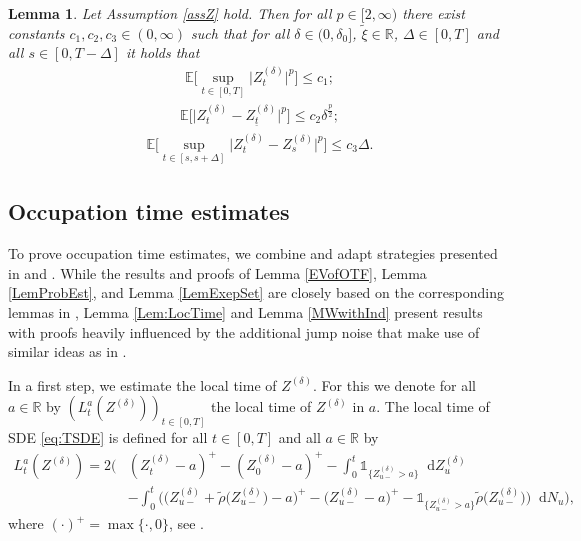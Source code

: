 \documentclass[11pt,a4paper]{article}
\numberwithin{equation}{section}
\newtheorem{lemma}[theorem]{Lemma}
\theoremstyle{definition}
\newcommand{\E}{{\mathbb{E}}}
\newcommand{\R}{{\mathbb{R}}}
\newcommand{\diff}{\mathop{}\!\mathrm{d}}
\begin{document}
\begin{lemma}\label{ME}
Let Assumption \ref{assZ} hold. Then for all $p\in[2,\infty)$ there exist constants $c_1, c_2, c_3 \in(0,\infty)$ such that for all $\delta\in(0,\delta_0]$, $\widetilde\xi\in\R$, $\Delta \in[0,T]$ and all $s\in[0,T-\Delta]$ it holds that 
\begin{equation}\label{LME1}
\begin{aligned}
\E\Big[\sup_{t\in[0,T]} \big|Z^{(\delta)}_t\big|^p\Big] \leq c_1;
\end{aligned}
\end{equation}
\begin{equation}\label{LME2}
\begin{aligned}
\E\Big[  \big|Z^{(\delta)}_t- Z^{(\delta)}_{\underline t}\big|^p\Big] \leq c_2 \delta^{\frac{p}{2}};
\end{aligned}
\end{equation}
\begin{equation}\label{LME4}
    \begin{aligned}
    \E\Big[\sup_{t\in[s,s+\Delta]} \big|Z^{(\delta)}_t- Z^{(\delta)}_{s}\big|^p\Big] \leq c_3 \Delta.
    \end{aligned}
\end{equation}
\end{lemma}

\subsection{Occupation time estimates}

To prove occupation time estimates, we combine and adapt strategies presented in \cite{PSS2024JMS} and \cite{Yaroslavtseva2022}. While the results and proofs of Lemma \ref{EVofOTF}, Lemma \ref{LemProbEst}, and Lemma \ref{LemExepSet} are closely based on the corresponding lemmas in \cite{Yaroslavtseva2022}, Lemma \ref{Lem:LocTime} and Lemma \ref{MWwithInd} present results with proofs heavily influenced by the additional jump noise that make use of similar ideas as in \cite{PSS2024JMS}.

In a first step, we estimate the local time of $Z^{(\delta)}$. For this we denote for all $a\in\R$ by $(L_t^a(Z^{(\delta)}))_{t\in[0,T]}$ the local time of $Z^{(\delta)}$ in $a$. The local time of SDE \eqref{eq:TSDE} is defined for all $t\in[0,T]$ and all $a\in\R$ by
\begin{equation}
    \begin{aligned}
    L_t^a(Z^{(\delta)}) = 2 \Big(&(Z_t^{(\delta)}-a)^+ - (Z_0^{(\delta)}-a)^+ - \int_0^t \mathds{1}_{\{Z^{(\delta)}_{u-} >a\}} \diff Z^{(\delta)}_{u} \\
    &- \int_0^t \Big( \big( Z^{(\delta)}_{u-} + \widetilde\rho\big(Z^{(\delta)}_{u-}\big)- a\big)^+ - \big( Z^{(\delta)}_{u-} - a\big)^+ - \mathds{1}_{\{Z^{(\delta)}_{u-} >a\}} \widetilde\rho\big(Z^{(\delta)}_{u-}\big)\Big) \diff N_u \Big),
    \end{aligned}
\end{equation}
where  $(\cdot)^+ = \max\{\cdot,0\}$, see \cite[Definition 156]{situ2005}.
\end{document}
